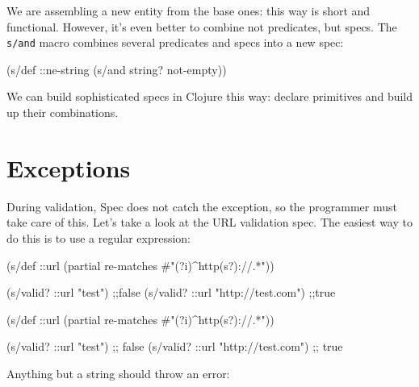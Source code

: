 
We are assembling a new entity from the base ones: this way is short and functional. However, it's even better to combine not predicates, but specs. The \verb|s/and| macro combines several predicates and specs into a new spec:

\begin{english}
  \begin{clojure}
(s/def ::ne-string
  (s/and string? not-empty))
  \end{clojure}
\end{english}

We can build sophisticated specs in Clojure this way: declare primitives and build up their combinations. 

\section{Exceptions}


During validation, Spec does not catch the exception, so the programmer must take care of this. Let's take a look at the URL validation spec. The easiest way to do this is to use a regular expression:


\ifx\DEVICETYPE\MOBILE

\begin{english}
  \begin{clojure}
(s/def ::url
  (partial
    re-matches #"(?i)^http(s?)://.*"))

(s/valid? ::url "test") ;;false
(s/valid? ::url "http://test.com") ;;true
  \end{clojure}
\end{english}

\else

\begin{english}
  \begin{clojure}
(s/def ::url
  (partial re-matches #"(?i)^http(s?)://.*"))

(s/valid? ::url "test")            ;; false
(s/valid? ::url "http://test.com") ;; true
  \end{clojure}
\end{english}

\fi

Anything but a string should throw an error:

